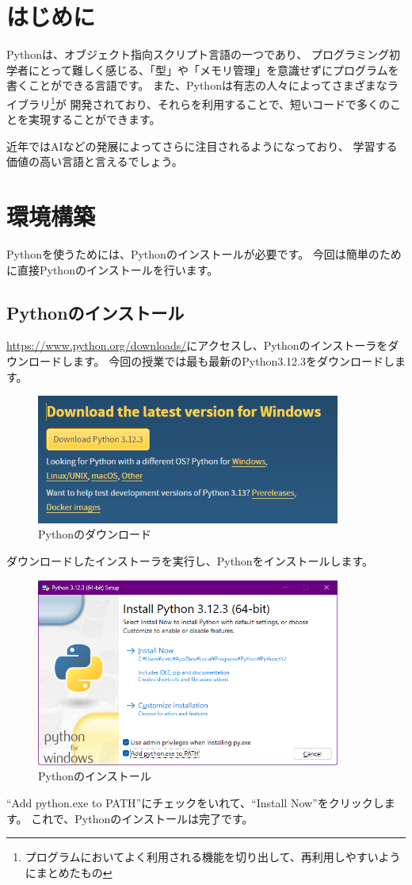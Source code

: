 \documentclass[a4paper,titlepage,dvipdfmx]{jarticle}
\begin{document}
\section{はじめに}
Pythonは、オブジェクト指向スクリプト言語の一つであり、
プログラミング初学者にとって難しく感じる、「型」や「メモリ管理」を意識せずにプログラムを書くことができる言語です。
また、Pythonは有志の人々によってさまざまなライブラリ\footnote{プログラムにおいてよく利用される機能を切り出して、再利用しやすいようにまとめたもの}が
開発されており、それらを利用することで、短いコードで多くのことを実現することができます。

近年ではAIなどの発展によってさらに注目されるようになっており、
学習する価値の高い言語と言えるでしょう。
\section{環境構築}
Pythonを使うためには、Pythonのインストールが必要です。
今回は簡単のために直接Pythonのインストールを行います。
\subsection{Pythonのインストール}
\url{https://www.python.org/downloads/}にアクセスし、Pythonのインストーラをダウンロードします。
今回の授業では最も最新のPython3.12.3をダウンロードします。
\begin{figure}[H]
  \centering
  \includegraphics[width=10cm]{./figs/python-download.png}
  \caption{Pythonのダウンロード}
\end{figure}

ダウンロードしたインストーラを実行し、Pythonをインストールします。
\begin{figure}[H]
  \centering
  \includegraphics[width=10cm]{./figs/python-install.png}
  \caption{Pythonのインストール}
\end{figure}
``Add python.exe to PATH''にチェックをいれて、``Install Now''をクリックします。
これで、Pythonのインストールは完了です。
\end{document}
